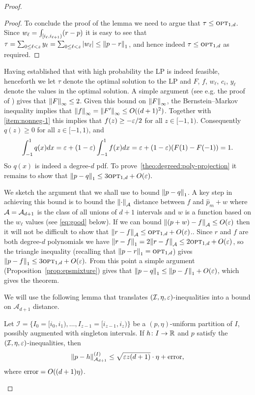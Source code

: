\begin{proof}
\begin{proof}
To conclude the proof of the lemma we need to argue that 
$\tau \leq {\textsc{opt}}_{1,d}$.
Since $w_\ell = \int_{[i_\ell,i_{\ell+1})} ({{r}-{p}})$ it
is easy to see that $\tau = \sum_{0 \leq \ell < {z}} y_\ell = \sum_{0
\leq \ell < {z}} |w_\ell| \leq {\lVert{p}-{r}{\rVert}}_1$, and
hence indeed $\tau \leq {\textsc{opt}}_{1,d}$ as required.
\end{proof}

Having established that with high probability the LP is indeed feasible,
henceforth we let $\tau$ denote the optimal solution to the LP and
$F$, $f$, $w_\ell$, $c_i$, $y_\ell$ denote the values in the optimal solution.
A simple argument (see e.g. the proof of {\cite[Theorem~8]{AK:03}}) gives that ${\lVert F{\rVert}}_\infty\leq 2$.
Given this bound on ${\lVert F{\rVert}}_\infty$, the Bernstein--Markov inequality implies that ${\lVert f{\rVert}}_\infty = {\lVert F^\prime{\rVert}}_\infty\leq O((d+1)^2)$.
Together with \ref{item:nonneg-1} this implies that
$f(z) \geq -\varepsilon/2$ for all $z \in [-1,1)$.
Consequently $q(z) \geq 0$ for all $z \in [-1,1)$,
and
\[
\int_{-1}^1 q(x) dx = \varepsilon + (1 - \varepsilon) \int_{-1}^1 f(x)dx = \varepsilon +
(1-\varepsilon)(F(1)-F(-1)) = 1. \]
So $q(x)$ is indeed a degree-$d$ pdf.  To prove~\cref{theo:degreed:poly-projection} it remains to show that ${\lVert p-q{\rVert}}_1 \leq 3 {\textsc{opt}}_{1,d} + O(\varepsilon).$

We sketch the argument that we shall use to bound ${\lVert p-q{\rVert}}_1$.
A key step in achieving this bound is to 
bound the $\lVert\cdot{\rVert}_{\cal A}$ distance between $f$ and
$\widehat{p}_m + w$ where ${\cal A} = {\mathcal A_{d+1}}$ is the class of
all unions of $d+1$ intervals and $w$ is a function based on the $w_\ell$
values (see \eqref{eq:good} below).
If we can bound $\lVert(p+w)- f{\rVert}_{\cal A} \leq O(\varepsilon)$ then it will not be difficult to show that
$\lVert r - f{\rVert}_{\cal A} \leq {\textsc{opt}}_{1,d} + O(\varepsilon)$.. 
Since $r$ and $f$ are both degree-$d$ polynomials we have 
${\lVert r - f{\rVert}}_1 = 2\lVert r - f{\rVert}_{\cal A}  \leq 2 {\textsc{opt}}_{1,d} + O(\varepsilon)$, 
so the triangle inequality (recalling that
${\lVert p-r{\rVert}}_1 = {\textsc{opt}}_{1,d}$) gives
${\lVert p-f{\rVert}}_1 \leq 3 {\textsc{opt}}_{1,d}+O(\varepsilon).$
 From this point a simple argument 
(Proposition~\ref{prop:epsmixture}) gives that
${\lVert p-q{\rVert}}_1 \leq {\lVert p-f{\rVert}}_1 + O(\varepsilon)$, which gives the theorem.

We will use the following lemma {that translates $(\mathcal{I}, \eta,\varepsilon)$-inequalities into a bound on $\mathcal A_{d+1}$ distance}.

\begin{lemma} \label{lem:ad-dist}
Let $\mathcal{I} = \{I_0=[i_0, i_1), \dots, I_{z-1}=[i_{z-1}, i_z)\}$ be a
$(p,\eta)$-uniform partition of $I$, possibly augmented with singleton intervals.
If $h\colon I\to \mathbb{R}$ and $p$ satisfy the $(\mathcal{I}, \eta,
\varepsilon)$-inequalities, then
\[ {\lVert p-h{\rVert}_{\mathcal A_{{d+1}}}^{(I)} \leq \sqrt{\varepsilon z {(d+1)}}\cdot \eta + {\rm error},} \]
{where ${\rm error} = O({(d+1)}\eta)$}.
\end{lemma}


\end{proof}
